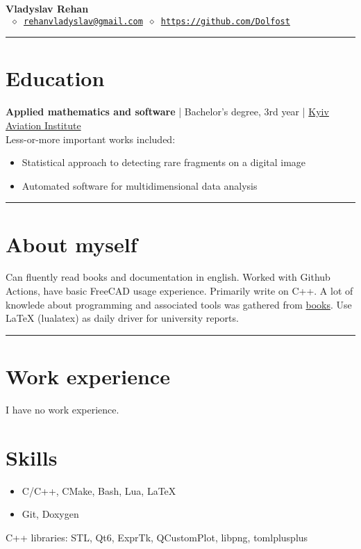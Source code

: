 


\newcommand{\crule}{\par\noindent\rule{\textwidth}{0.5pt}}


\thispagestyle{empty}

\begin{center}
	\LARGE \textbf{Vladyslav Rehan}\\[4mm] \normalsize
	\texttt{ \(\diamond\)\
	\href{mailto:rehanvladyslav@gmail.com}{rehanvladyslav@gmail.com} \(\diamond\)
	\url{https://github.com/Dolfost}}
\end{center}
\crule
\section{Education}
\textbf{Applied mathematics and software} | Bachelor's degree, 3rd year | \href{http://nau.edu.ua/en/}{Kyiv Aviation Institute}\\
Less-or-more important works included:
\begin{itemize}
	\item Statistical approach to detecting rare fragments on a digital image
	\item Automated software for multidimensional data analysis
\end{itemize}

\crule
\section{About myself}
Can fluently read books and documentation in english. Worked with Github
Actions, have basic FreeCAD usage experience. Primarily write on C++. A lot of
knowlede about programming and associated tools was gathered from
\href{https://github.com/Dolfost/Dolfost/blob/main/README.md#literature--sources}{books}.
Use LaTeX (lualatex) as daily driver for university reports.

\crule
\section{Work experience}
I have no work experience.

\section{Skills}
\begin{itemize}
	\item C/C++, CMake, Bash, Lua, LaTeX
	\item Git, Doxygen
\end{itemize}
C++ libraries: STL, Qt6, ExprTk, QCustomPlot, libpng, tomlplusplus

